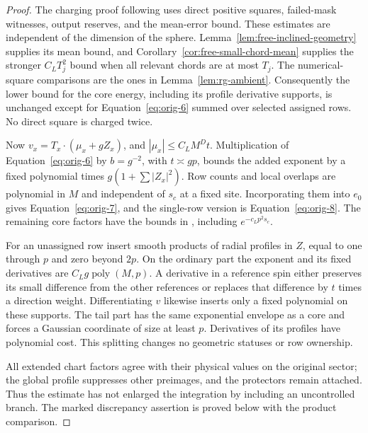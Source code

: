 \begin{proof}
The charging proof following  uses direct
positive squares, failed-mask witnesses, output reserves, and the
mean-error bound.  These estimates are independent of the dimension
of the sphere.  Lemma~\ref{lem:free-inclined-geometry} supplies its mean bound,
and Corollary~\ref{cor:free-small-chord-mean} supplies the stronger
$C_LT_j^2$ bound when all relevant chords are at most $T_j$.  The numerical-square comparisons are the ones in
Lemma~\ref{lem:rg-ambient}.  Consequently the lower bound for the core
energy, including its profile derivative supports, is unchanged
except for Equation~\eqref{eq:orig-6} summed over selected assigned
rows.  No direct square is charged twice.

Now $v_x=T_x\cdot(\mu_x+gZ_x)$, and
$|\mu_x|\le C_LM^Dt$.  Multiplication of
Equation~\eqref{eq:orig-6} by $b=g^{-2}$, with $t\asymp gp$, bounds
the added exponent by a fixed polynomial times
$g(1+\sum|Z_x|^2)$.  Row counts and local overlaps are polynomial in
$M$ and independent of $s_c$ at a fixed site.  Incorporating them into
$e_0$ gives Equation~\eqref{eq:orig-7}, and the single-row version is
Equation~\eqref{eq:orig-8}.  The remaining core factors have the bounds
in , including $e^{-c_Lp^2s_c}$.

For an unassigned row insert smooth products of radial profiles in
$Z$, equal to one through $p$ and zero beyond $2p$.  On the ordinary
part the exponent and its fixed derivatives are
$C_Lg\operatorname{poly}(M,p)$.  A derivative in a reference spin
either preserves its small difference from the other references or
replaces that difference by $t$ times a direction weight.
Differentiating $v$ likewise inserts only a fixed polynomial on these
supports.  The tail part has the same exponential envelope as a core
and forces a Gaussian coordinate of size at least $p$.  Derivatives
of its profiles have polynomial cost.  This splitting changes no
geometric statuses or row ownership.

All extended chart factors agree with their physical values on the
original sector; the global profile suppresses other preimages, and
the protectors remain attached.  Thus the estimate has not enlarged
the integration by including an uncontrolled branch.  The marked
discrepancy assertion is proved below with the product comparison.
\end{proof}

